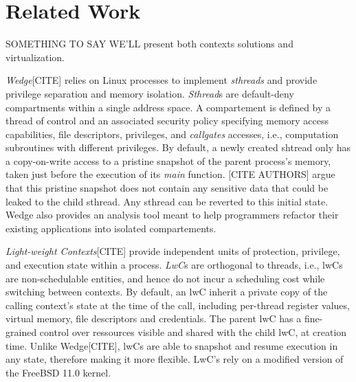 \chapter{Related Work}
SOMETHING TO SAY WE'LL present both contexts solutions and virtualization.

\textit{Wedge}[CITE] relies on Linux processes to implement \textit{sthreads} and provide 
privilege separation and memory isolation.
\textit{Sthread}s are default-deny compartments within a single address space.
A compartement is defined by a thread of control and an associated security policy specifying
memory access capabilities, file descriptors, privileges, and \textit{callgates} accesses, i.e., computation subroutines with different privileges.
By default, a newly created shtread only has a copy-on-write access to a pristine snapshot of the parent process's memory, taken just before the execution of its \textit{main} function.
[CITE AUTHORS] argue that this pristine snapshot does not contain any sensitive data that could be leaked
to the child sthread.
Any sthread can be reverted to this initial state.
Wedge also provides an analysis tool meant to help programmers refactor their existing applications into isolated compartements.

\textit{Light-weight Contexts}[CITE] provide independent units of protection, privilege, and execution state within a process.
\textit{LwC}s are orthogonal to threads, i.e., lwCs are non-schedulable entities, and hence do not incur a scheduling cost while switching between contexts.
By default, an lwC inherit a private copy of the calling context's state at the time of the call, including
per-thread register values, virtual memory, file descriptors and credentials.
The parent lwC has a fine-grained control over ressources visible and shared with the child lwC, at creation time.
Unlike Wedge[CITE], lwCs are able to snapshot and resume execution in any state, therefore making it more flexible.
LwC's rely on a modified version of the FreeBSD 11.0 kernel.


